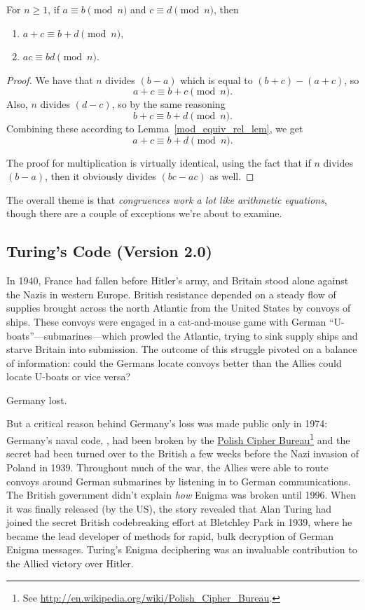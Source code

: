 \begin{lemma}\label{mod_congruence_lem} For $n \geq 1$, if
$a \equiv b \pmod{n}$ and $c \equiv d \pmod{n}$, then
\begin{enumerate}
\item $a + c \equiv b + d \pmod{n}$,\label{mod_congruence_lem+}
\item $a c \equiv b d \pmod{n}$.\label{mod_congruence_lem*}
\end{enumerate}
\end{lemma}

\begin{proof}
We have that $n$ divides $(b-a)$ which is equal to $(b+c)-(a+c)$, so
\[
a+c \equiv b+c \pmod{n}.
\]
Also, $n$ divides $(d-c)$, so by the same reasoning
\[
b + c \equiv b + d \pmod{n}.
\]
Combining these according to Lemma~\ref{mod_equiv_rel_lem}, we get
\[
a + c  \equiv b + d \pmod{n}.
\]
 
The proof for multiplication is virtually identical, using the fact
that if $n$ divides $(b-a)$, then it obviously divides $(bc-ac)$ as
well.
\end{proof}

The overall theme is that \emph{congruences work a lot like arithmetic
  equations}, though there are a couple of exceptions we're about to
examine.

\subsection{Turing's Code (Version 2.0)}

In 1940, France had fallen before Hitler's army, and Britain stood alone
against the Nazis in western Europe.  British resistance depended on a
steady flow of supplies brought across the north Atlantic from the United
States by convoys of ships.  These convoys were engaged in a cat-and-mouse
game with German ``U-boats''---submarines---which prowled the Atlantic,
trying to sink supply ships and starve Britain into submission.  The
outcome of this struggle pivoted on a balance of information: could the
Germans locate convoys better than the Allies could locate U-boats or vice
versa?

Germany lost.

But a critical reason behind Germany's loss was made public only in
1974: Germany's naval code, , had been broken by the
\href{http://en.wikipedia.org/wiki/Polish_Cipher_Bureau}{Polish Cipher
  Bureau}\footnote{See
  \url{http://en.wikipedia.org/wiki/Polish\_Cipher\_Bureau}.} and the
secret had been turned over to the British a few weeks before the Nazi
invasion of Poland in 1939.  Throughout much of the war, the Allies
were able to route convoys around German submarines by listening in to
German communications.  The British government didn't explain
\emph{how} Enigma was broken until 1996.  When it was finally released
(by the US), the story revealed that Alan Turing had joined the secret
British codebreaking effort at Bletchley Park in 1939, where he became
the lead developer of methods for rapid, bulk decryption of German
Enigma messages.  Turing's Enigma deciphering was an invaluable
contribution to the Allied victory over Hitler.


